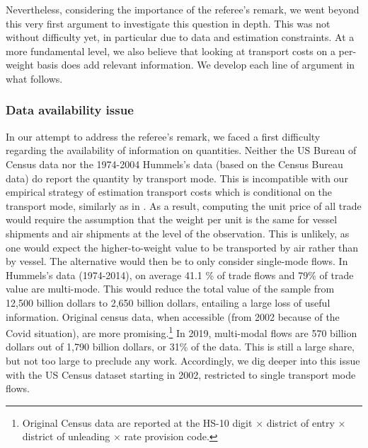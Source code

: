 \documentclass[a4paper,11pt]{article}
\begin{document}
Nevertheless, considering the importance of the referee's remark, we went beyond this very first argument to investigate this question in depth. This was not without difficulty yet, in particular due to data and estimation constraints. At a more fundamental level, we also believe that looking at transport costs on a per-weight basis does add relevant information. We develop each line of argument in what follows.





\subsubsection{Data availability issue}

In our attempt to address the referee's remark, we faced a first difficulty regarding the availability of information on quantities. Neither the US Bureau of Census data nor the 1974-2004 Hummels's data (based on the Census Bureau data) do report the quantity by transport mode. This is incompatible with our empirical strategy of estimation transport costs which is conditional on the transport mode, similarly as in \cite{hummels2007}. As a result, computing the unit price of all trade would require the assumption that the weight per unit is the same for vessel shipments and air shipments at the level of the observation. This is unlikely, as one would expect the higher-to-weight value to be transported by air rather than by vessel. The alternative would then be to only consider single-mode flows. In Hummels's data (1974-2014), on average 41.1 \% of trade flows and 79\% of trade value are multi-mode. This would reduce the total value of the sample from 12,500 billion dollars to 2,650 billion dollars, entailing a large loss of useful information. Original census data, when accessible (from 2002 because of the Covid situation), are more promising.\footnote{Original Census data are  reported at the HS-10 digit $\times$ district of entry $\times$ district of unleading $\times$ rate provision code.} In 2019, multi-modal flows are 570 billion dollars out of 1,790 billion dollars, or 31\% of the data. This is still a large share, but not too large to preclude any work. Accordingly, we dig deeper into this issue with the US Census dataset starting in 2002, restricted to single transport mode flows. \smallskip
\end{document}
